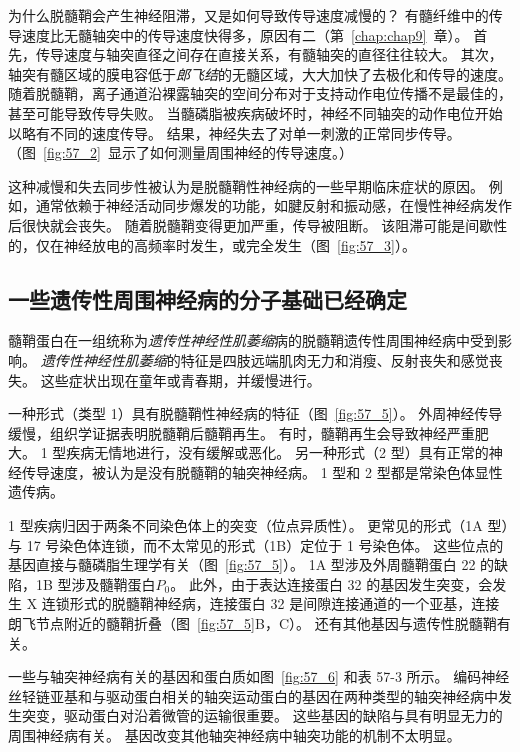为什么脱髓鞘会产生神经阻滞，又是如何导致传导速度减慢的？
有髓纤维中的传导速度比无髓轴突中的传导速度快得多，原因有二（第~\ref{chap:chap9}~章）。
首先，传导速度与轴突直径之间存在直接关系，有髓轴突的直径往往较大。
其次，轴突有髓区域的膜电容低于\textit{郎飞结}的无髓区域，大大加快了去极化和传导的速度。
随着脱髓鞘，离子通道沿裸露轴突的空间分布对于支持动作电位传播不是最佳的，甚至可能导致传导失败。
当髓磷脂被疾病破坏时，神经不同轴突的动作电位开始以略有不同的速度传导。
结果，神经失去了对单一刺激的正常同步传导。
（图~\ref{fig:57_2}~显示了如何测量周围神经的传导速度。）


这种减慢和失去同步性被认为是脱髓鞘性神经病的一些早期临床症状的原因。
例如，通常依赖于神经活动同步爆发的功能，如腱反射和振动感，在慢性神经病发作后很快就会丧失。
随着脱髓鞘变得更加严重，传导被阻断。
该阻滞可能是间歇性的，仅在神经放电的高频率时发生，或完全发生（图~\ref{fig:57_3}）。



\subsection{一些遗传性周围神经病的分子基础已经确定}

髓鞘蛋白在一组统称为\textit{遗传性神经性肌萎缩}病的脱髓鞘遗传性周围神经病中受到影响。
\textit{遗传性神经性肌萎缩}的特征是四肢远端肌肉无力和消瘦、反射丧失和感觉丧失。
这些症状出现在童年或青春期，并缓慢进行。


一种形式（类型 1）具有脱髓鞘性神经病的特征（图~\ref{fig:57_5}）。
外周神经传导缓慢，组织学证据表明脱髓鞘后髓鞘再生。
有时，髓鞘再生会导致神经严重肥大。
1 型疾病无情地进行，没有缓解或恶化。
另一种形式（2 型）具有正常的神经传导速度，被认为是没有脱髓鞘的轴突神经病。
1 型和 2 型都是常染色体显性遗传病。


1 型疾病归因于两条不同染色体上的突变（位点异质性）。
更常见的形式（1A 型）与 17 号染色体连锁，而不太常见的形式（1B）定位于 1 号染色体。
这些位点的基因直接与髓磷脂生理学有关（图~\ref{fig:57_5}）。
1A 型涉及外周髓鞘蛋白 22 的缺陷，1B 型涉及髓鞘蛋白$P_0$。
此外，由于表达连接蛋白 32 的基因发生突变，会发生 X 连锁形式的脱髓鞘神经病，连接蛋白 32 是间隙连接通道的一个亚基，连接朗飞节点附近的髓鞘折叠（图~\ref{fig:57_5}B，C）。
还有其他基因与遗传性脱髓鞘有关。


一些与轴突神经病有关的基因和蛋白质如图~\ref{fig:57_6} 和表 57-3 所示。
编码神经丝轻链亚基和与驱动蛋白相关的轴突运动蛋白的基因在两种类型的轴突神经病中发生突变，驱动蛋白对沿着微管的运输很重要。
这些基因的缺陷与具有明显无力的周围神经病有关。
基因改变其他轴突神经病中轴突功能的机制不太明显。


